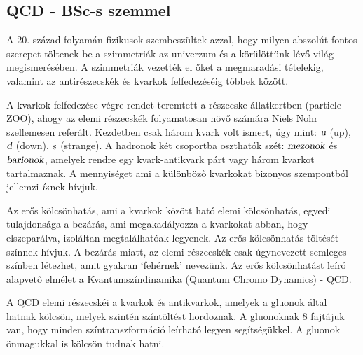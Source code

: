 \documentclass[a4paper,12pt]{article}
\begin{document}
\subsection{ QCD - BSc-s szemmel}
\vspace{5mm}
\par A 20. század folyamán fizikusok szembeszültek azzal, hogy milyen abszolút fontos szerepet töltenek be a szimmetriák az univerzum és a körülöttünk lévő világ megismerésében. A szimmetriák vezették el őket a megmaradási tételekig, valamint az antirészecskék és kvarkok felfedezéséig többek között. 
\vspace{5mm}
\par A kvarkok felfedezése végre rendet teremtett a részecske állatkertben (particle ZOO), ahogy az elemi részecskék folyamatosan növő számára Niels Nohr szellemesen referált.  Kezdetben csak három kvark volt ismert, úgy mint: $\textsl{u}$ (up), $\textsl{d}$ (down), $\textsl{s}$ (strange). A hadronok két csoportba oszthatók szét: $\textsl{mezonok}$ és $\textsl{barionok}$, amelyek rendre egy kvark-antikvark párt vagy három kvarkot tartalmaznak. A mennyiséget ami a különböző kvarkokat bizonyos szempontból jellemzi $\textsl{íz}$nek hívjuk.
\vspace{5mm}
\par Az erős kölcsönhatás, ami a kvarkok között ható elemi kölcsönhatás, egyedi tulajdonsága a bezárás, ami megakadályozza a kvarkokat abban, hogy elszeparálva, izoláltan megtalálhatóak legyenek. Az erős kölcsönhatás töltését színnek hívjuk. A bezárás miatt, az elemi részecskék csak úgynevezett semleges színben létezhet, amit gyakran `fehérnek' nevezünk. Az erős kölcsönhatást leíró alapvető elmélet a Kvantumszíndinamika (Quantum Chromo Dynamics) - QCD.
\vspace{5mm}
\par A QCD elemi részecskéi a kvarkok és antikvarkok, amelyek a gluonok által hatnak kölcsön, melyek szintén színtöltést hordoznak. A gluonoknak 8 fajtájuk van, hogy minden színtranszformáció leírható legyen segítségükkel. A gluonok önmagukkal is kölcsön tudnak hatni.
\end{document}
